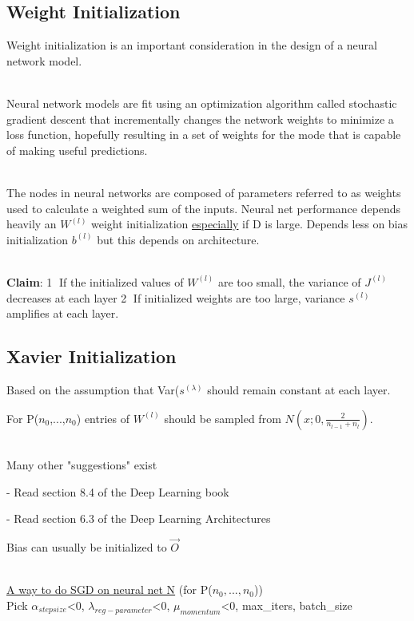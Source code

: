 \subsection{Weight Initialization}
Weight initialization is an important consideration in the design of a neural network model.

~\\Neural network models are fit using an optimization algorithm called stochastic gradient descent that incrementally changes the network weights to minimize a loss function, hopefully resulting in a set of weights for the mode that is capable of making useful predictions.

~\\The nodes in neural networks are composed of parameters referred to as weights used to calculate a weighted sum of the inputs.
Neural net performance depends heavily an $W^{(l)}$ weight initialization \underline{especially} if D is large. Depends less on bias initialization $b^{(l)}$ but this depends on architecture.

~\\\textbf{Claim}: 
\textcircled{1} If the initialized values of $W^{(l)}$ are too small, the variance of $J^{(l)}$ decreases at each layer 
\textcircled{2} If initialized weights are too large, variance $s^{(l)}$ amplifies at each layer.


\subsection{Xavier Initialization} Based on the assumption that Var($s^{(\lambda)}$ should remain constant at each layer.

For P($n_{0}$,...,$n_{0}$) entries of $W^{(l)}$ should be sampled from $N(x;0,\frac{2}{n_{l-1}+n_{l}})$.

~\\Many other "suggestions" exist

- Read section 8.4 of the Deep Learning book

- Read section 6.3 of the Deep Learning Architectures

Bias can usually be initialized to $\vec{O}$ \par


~\\\underline{A way to do SGD on neural net N} (for P($n_{0},...,n_{0}$))\\

Pick $\alpha_{step size}$\textless{0}, $\lambda_{reg-parameter}$\textless{0}, $\mu_{momentum}$\textless{0}, max\_iters, batch\_size



